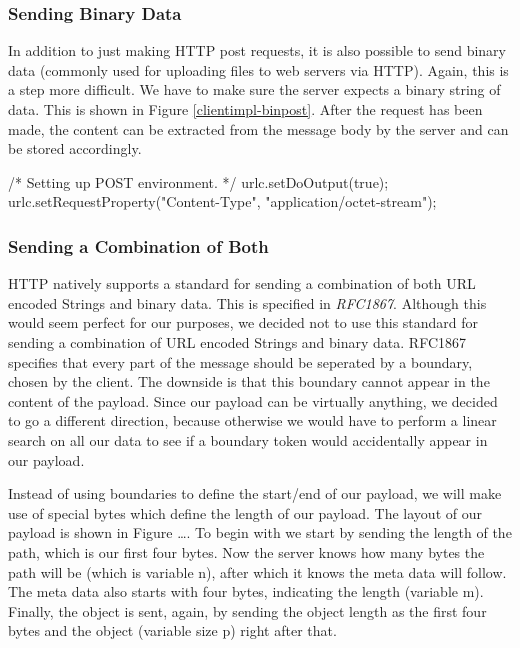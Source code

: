 \subsubsection{Sending Binary Data}
In addition to just making HTTP post requests, it is also possible to send binary
data (commonly used for uploading files to web servers via HTTP). Again, this is
a step more difficult. We have to make sure the server expects a binary string of
data. This is shown in Figure \ref{clientimpl-binpost}. After the request has
been made, the content can be extracted from the message body by the server and
can be stored accordingly.

\begin{figure*}[ht] %
\begin{center}
\begin{code}
/* Setting up POST environment. */
urlc.setDoOutput(true);
urlc.setRequestProperty("Content-Type", "application/octet-stream");
\end{code}
\caption{Making a binary HTTP POST request.\label{clientimpl-binpost}}
\end{center}
\end{figure*}

\subsubsection{Sending a Combination of Both}
\label{clientimpl-sending-both}
HTTP natively supports a standard for sending a combination of both URL encoded
Strings and binary data. This is specified in \emph{RFC1867}. Although this
would seem perfect for our purposes, we decided not to use this standard for
sending a combination of URL encoded Strings and binary data. RFC1867 specifies
that every part of the message should be seperated by a boundary, chosen by the
client. The downside is that this boundary cannot appear in the content of the
payload. Since our payload can be virtually anything, we decided to go a
different direction, because otherwise we would have to perform a linear search
on all our data to see if a boundary token would accidentally appear in our
payload.

Instead of using boundaries to define the start/end of our payload, we will make
use of special bytes which define the length of our payload. The layout of our
payload is shown in Figure \ldots. To begin with we start by sending the length
of the path, which is our first four bytes. Now the server knows how many bytes
the path will be (which is variable n), after which it knows the meta data will
follow. The meta data also starts with four bytes, indicating the length
(variable m). Finally, the object is sent, again, by sending the object length
as the first four bytes and the object (variable size p) right after that.


